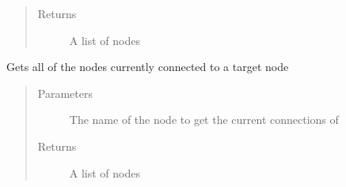 \documentclass[letterpaper,10pt,english]{sphinxmanual}
\begin{document}
\begin{fulllineitems}
\begin{fulllineitems}
\begin{quote}
\begin{description}
\item[{Returns}] \leavevmode
\sphinxAtStartPar
A list of nodes

\end{description}\end{quote}

\end{fulllineitems}


\begin{fulllineitems}
\label{\detokenize{source/yawning_titan.envs.generic.core:yawning_titan.envs.generic.core.network_interface.NetworkInterface.get_current_adj_matrix}}
\end{fulllineitems}


\begin{fulllineitems}
\label{\detokenize{source/yawning_titan.envs.generic.core:yawning_titan.envs.generic.core.network_interface.NetworkInterface.get_current_connected_nodes}}
\sphinxAtStartPar
Gets all of the nodes currently connected to a target node
\begin{quote}\begin{description}
\item[{Parameters}] \leavevmode
\sphinxAtStartPar
{} \textendash{} The name of the node to get the current connections of

\item[{Returns}] \leavevmode
\sphinxAtStartPar
A list of nodes

\end{description}\end{quote}

\end{fulllineitems}


\end{fulllineitems}
\end{document}
